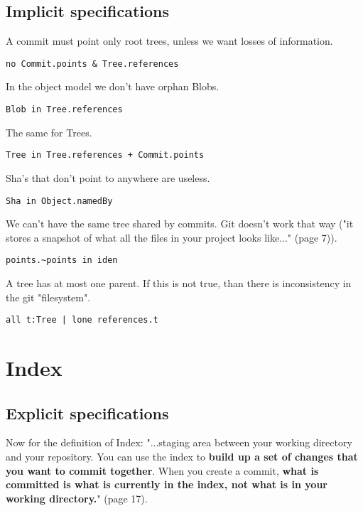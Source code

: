 \subsection{Implicit specifications}

A commit must point only root trees, unless we want
losses of information.
\begin{lstlisting}
no Commit.points & Tree.references    
\end{lstlisting}

In the object model we don't have orphan Blobs. 
\begin{lstlisting}
Blob in Tree.references
\end{lstlisting}

The same for Trees.
\begin{lstlisting}
Tree in Tree.references + Commit.points
\end{lstlisting}

Sha's that don't point to anywhere are useless.
\begin{lstlisting}
Sha in Object.namedBy
\end{lstlisting}

We can't have the same tree shared by commits. Git
doesn't work that way ("it stores a snapshot of what all 
the files in your project looks like..." \cite{gitComm} (page 7)).
\begin{lstlisting}
points.~points in iden 
\end{lstlisting}

A tree has at most one parent. If this is not true, than there 
is inconsistency in the git "filesystem".
\begin{lstlisting}
all t:Tree | lone references.t
\end{lstlisting}

\section{Index}

\subsection{Explicit specifications}

Now for the definition of Index:
"...staging area between your working directory and your
repository. You can use the index to {\bf build up a set of 
changes that you want to commit together}. When you create
a commit, {\bf what is committed is what is currently in the
index, not what is in your working directory.}"
\cite{gitComm} (page 17). \par

